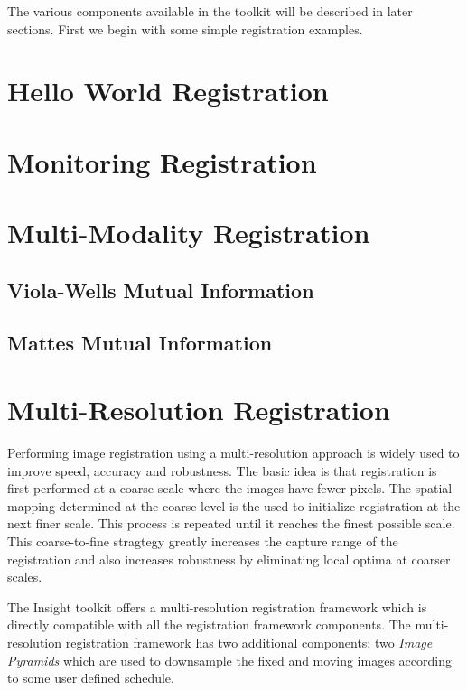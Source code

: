The various components available in the toolkit will be described in later sections.
First we begin with some simple registration examples.

\section{Hello World Registration}
\label{sec:IntroductionImageRegistration}


\section{Monitoring Registration}
\label{sec:MonitoringImageRegistration}




\section{Multi-Modality Registration}

\subsection{Viola-Wells Mutual Information}


\subsection{Mattes Mutual Information}




\section{Multi-Resolution Registration}
\label{sec:MultiResolutionRegistration}
Performing image registration using a multi-resolution approach is widely used
to improve speed, accuracy and robustness. The basic idea is that registration
is first performed at a coarse scale where the images have fewer pixels.
The spatial mapping determined at the coarse level is the used to initialize
registration at the next finer scale. This process is repeated until it
reaches the finest possible scale. This coarse-to-fine stragtegy greatly
increases the capture range of the registration and also increases robustness
by eliminating local optima at coarser scales.

The Insight toolkit offers a multi-resolution registration framework which
is directly compatible with all the registration framework components. The
multi-resolution registration framework has two additional components:
two \emph{Image Pyramids} which are used to downsample the fixed and moving
images according to some user defined schedule.
 
